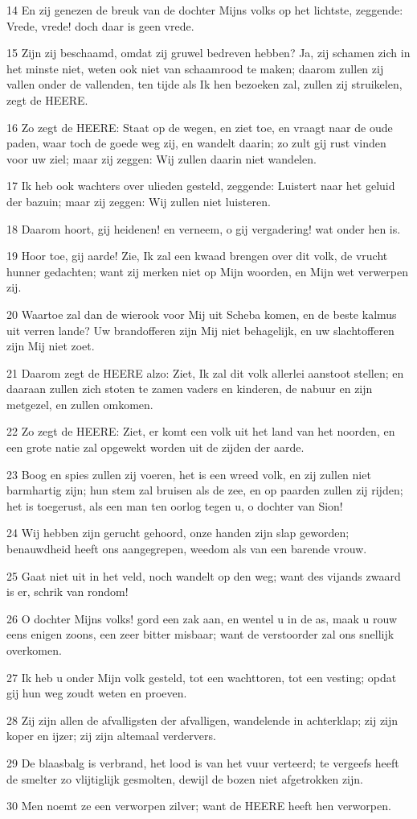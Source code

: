\par 14 En zij genezen de breuk van de dochter Mijns volks op het lichtste, zeggende: Vrede, vrede! doch daar is geen vrede.
\par 15 Zijn zij beschaamd, omdat zij gruwel bedreven hebben? Ja, zij schamen zich in het minste niet, weten ook niet van schaamrood te maken; daarom zullen zij vallen onder de vallenden, ten tijde als Ik hen bezoeken zal, zullen zij struikelen, zegt de HEERE.
\par 16 Zo zegt de HEERE: Staat op de wegen, en ziet toe, en vraagt naar de oude paden, waar toch de goede weg zij, en wandelt daarin; zo zult gij rust vinden voor uw ziel; maar zij zeggen: Wij zullen daarin niet wandelen.
\par 17 Ik heb ook wachters over ulieden gesteld, zeggende: Luistert naar het geluid der bazuin; maar zij zeggen: Wij zullen niet luisteren.
\par 18 Daarom hoort, gij heidenen! en verneem, o gij vergadering! wat onder hen is.
\par 19 Hoor toe, gij aarde! Zie, Ik zal een kwaad brengen over dit volk, de vrucht hunner gedachten; want zij merken niet op Mijn woorden, en Mijn wet verwerpen zij.
\par 20 Waartoe zal dan de wierook voor Mij uit Scheba komen, en de beste kalmus uit verren lande? Uw brandofferen zijn Mij niet behagelijk, en uw slachtofferen zijn Mij niet zoet.
\par 21 Daarom zegt de HEERE alzo: Ziet, Ik zal dit volk allerlei aanstoot stellen; en daaraan zullen zich stoten te zamen vaders en kinderen, de nabuur en zijn metgezel, en zullen omkomen.
\par 22 Zo zegt de HEERE: Ziet, er komt een volk uit het land van het noorden, en een grote natie zal opgewekt worden uit de zijden der aarde.
\par 23 Boog en spies zullen zij voeren, het is een wreed volk, en zij zullen niet barmhartig zijn; hun stem zal bruisen als de zee, en op paarden zullen zij rijden; het is toegerust, als een man ten oorlog tegen u, o dochter van Sion!
\par 24 Wij hebben zijn gerucht gehoord, onze handen zijn slap geworden; benauwdheid heeft ons aangegrepen, weedom als van een barende vrouw.
\par 25 Gaat niet uit in het veld, noch wandelt op den weg; want des vijands zwaard is er, schrik van rondom!
\par 26 O dochter Mijns volks! gord een zak aan, en wentel u in de as, maak u rouw eens enigen zoons, een zeer bitter misbaar; want de verstoorder zal ons snellijk overkomen.
\par 27 Ik heb u onder Mijn volk gesteld, tot een wachttoren, tot een vesting; opdat gij hun weg zoudt weten en proeven.
\par 28 Zij zijn allen de afvalligsten der afvalligen, wandelende in achterklap; zij zijn koper en ijzer; zij zijn altemaal verdervers.
\par 29 De blaasbalg is verbrand, het lood is van het vuur verteerd; te vergeefs heeft de smelter zo vlijtiglijk gesmolten, dewijl de bozen niet afgetrokken zijn.
\par 30 Men noemt ze een verworpen zilver; want de HEERE heeft hen verworpen.

